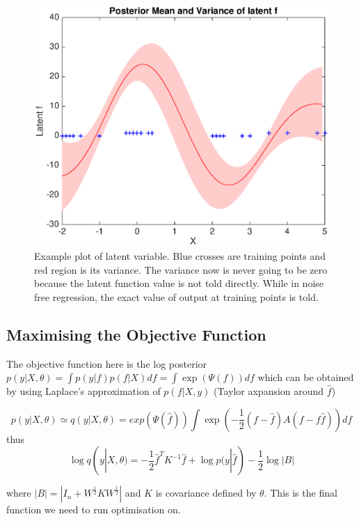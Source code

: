 \documentclass[14pt]{report}
\numberwithin{equation}{chapter}
\begin{document}
\begin{spacing}{2}
\begin{figure}
\centering
\includegraphics[scale=0.5]{classification_latent_f.eps}
\caption{Example plot of latent variable. Blue crosses are training points and red region is its variance. The variance now is never going to be zero because the latent function value is not told directly. While in noise free regression, the exact value of output at training points is told.}
\end{figure}

\subsection{Maximising the Objective Function}
The objective function here is the log posterior $p(y|X,\theta) = \int p(y|f)p(f|X) df = \int \operatorname{exp}(\Psi(f)) df$ which can be obtained by using Laplace's approximation of $p(f|X,y)$ (Taylor axpansion around $\hat{f}$)

\begin{equation}
p(y|X,\theta) \simeq q(y|X,\theta) = exp(\Psi(\hat{f})) \int \operatorname{exp}(-\frac{1}{2}(f - \hat{f})A(f-f\hat{f})) df
\end{equation}
thus
\begin{equation}
\operatorname{log}q(y|X,\theta) = -\frac{1}{2}\hat{f}^TK^{-1}\hat{f} + \operatorname{log}p(y|\hat{f}) - \frac{1}{2}\operatorname{log}|B|
\end{equation}

where $|B| = |I_n + W^{\frac{1}{2}} K W^{\frac{1}{2}}|$ and $K$ is covariance defined by $\theta$. This is the final function we need to run optimisation on. 


\end{spacing}
\end{document}
